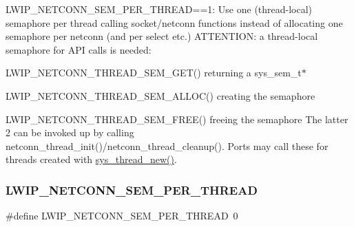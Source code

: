 L\+W\+I\+P\+\_\+\+N\+E\+T\+C\+O\+N\+N\+\_\+\+S\+E\+M\+\_\+\+P\+E\+R\+\_\+\+T\+H\+R\+E\+AD==1\+: Use one (thread-\/local) semaphore per thread calling socket/netconn functions instead of allocating one semaphore per netconn (and per select etc.) A\+T\+T\+E\+N\+T\+I\+ON\+: a thread-\/local semaphore for A\+PI calls is needed\+:
\begin{DoxyItemize}
\item L\+W\+I\+P\+\_\+\+N\+E\+T\+C\+O\+N\+N\+\_\+\+T\+H\+R\+E\+A\+D\+\_\+\+S\+E\+M\+\_\+\+G\+E\+T() returning a sys\+\_\+sem\+\_\+t$\ast$
\item L\+W\+I\+P\+\_\+\+N\+E\+T\+C\+O\+N\+N\+\_\+\+T\+H\+R\+E\+A\+D\+\_\+\+S\+E\+M\+\_\+\+A\+L\+L\+O\+C() creating the semaphore
\item L\+W\+I\+P\+\_\+\+N\+E\+T\+C\+O\+N\+N\+\_\+\+T\+H\+R\+E\+A\+D\+\_\+\+S\+E\+M\+\_\+\+F\+R\+E\+E() freeing the semaphore The latter 2 can be invoked up by calling netconn\+\_\+thread\+\_\+init()/netconn\+\_\+thread\+\_\+cleanup(). Ports may call these for threads created with \hyperlink{group__sys__misc_ga0d596afdd8dbcfad320172d39b0f607a}{sys\+\_\+thread\+\_\+new()}. 
\end{DoxyItemize}\mbox{\label{group__lwip__opts__netconn_ga2543345adf7d2c307df78a54ac2ba8c4}} 
\subsubsection{\texorpdfstring{L\+W\+I\+P\+\_\+\+N\+E\+T\+C\+O\+N\+N\+\_\+\+S\+E\+M\+\_\+\+P\+E\+R\+\_\+\+T\+H\+R\+E\+AD}{LWIP\_NETCONN\_SEM\_PER\_THREAD}\hspace{0.1cm}{\footnotesize\ttfamily [2/2]}}
{\footnotesize\ttfamily \#define L\+W\+I\+P\+\_\+\+N\+E\+T\+C\+O\+N\+N\+\_\+\+S\+E\+M\+\_\+\+P\+E\+R\+\_\+\+T\+H\+R\+E\+AD~0}

